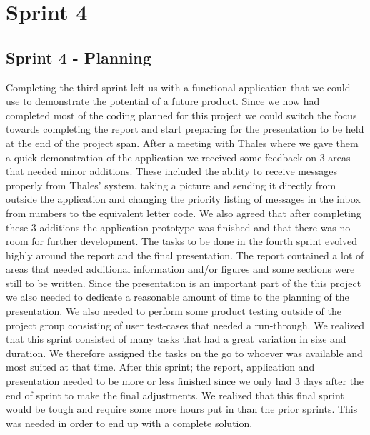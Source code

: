 \chapter{Sprint 4}

\section{Sprint 4 - Planning}


Completing the third sprint left us with a functional application that we could use to demonstrate the potential of a future product. Since we now had completed most of the coding planned for this project we could switch the focus towards completing the report and start preparing for the presentation to be held at the end of the project span.
\newline
\newline
After a meeting with Thales where we gave them a quick demonstration of the application we received some feedback on 3 areas that needed minor additions. These included the ability to receive messages properly from Thales' system, taking a picture and sending it directly from outside the application and changing the priority listing of messages in the inbox from numbers to the equivalent letter code. We also agreed that after completing these 3 additions the application prototype was finished and that there was no room for further development.
\newline
\newline
The tasks to be done in the fourth sprint evolved highly around the report and the final presentation. The report contained a lot of areas that needed additional information and/or figures and some sections were still to be written. Since the presentation is an important part of the this project we also needed to dedicate a reasonable amount of time to the planning of the presentation. We also needed to perform some product testing outside of the project group consisting of user test-cases that needed a run-through. We realized that this sprint consisted of many tasks that had a great variation in size and duration. We therefore assigned the tasks on the go to whoever was available and most suited at that time.
\newline
\newline
After this sprint; the report, application and presentation needed to be more or less finished since we only had 3 days after the end of sprint to make the final adjustments. We realized that this final sprint would be tough and require some more hours put in than the prior sprints. This was needed in order to end up with a complete solution. 
      
